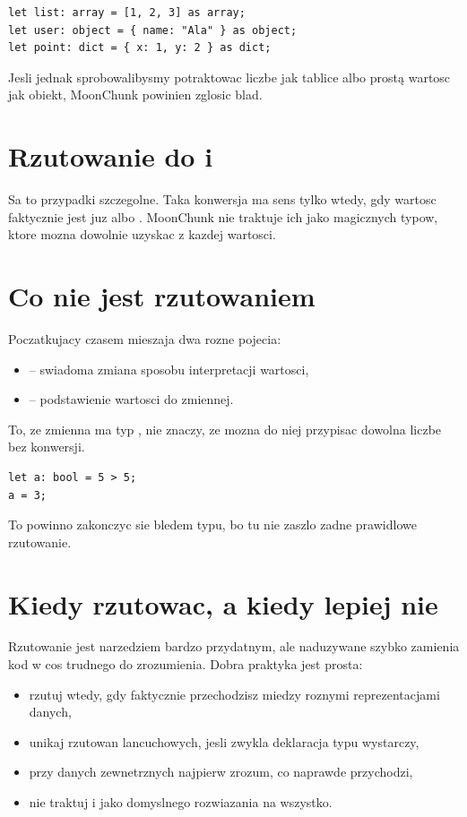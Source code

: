 \begin{lstlisting}[style=moonchunk,caption={Rzutowania typow zlozonych}]
let list: array = [1, 2, 3] as array;
let user: object = { name: "Ala" } as object;
let point: dict = { x: 1, y: 2 } as dict;
\end{lstlisting}

Jesli jednak sprobowalibysmy potraktowac liczbe jak tablice albo prostą wartosc jak
obiekt, MoonChunk powinien zglosic blad.

\section{Rzutowanie do  i }
Sa to przypadki szczegolne. Taka konwersja ma sens tylko wtedy, gdy wartosc faktycznie
jest juz  albo . MoonChunk nie traktuje ich jako magicznych typow,
ktore mozna dowolnie uzyskac z kazdej wartosci.

\section{Co nie jest rzutowaniem}
Poczatkujacy czasem mieszaja dwa rozne pojecia:

\begin{itemize}
  \item {} -- swiadoma zmiana sposobu interpretacji wartosci,
  \item {} -- podstawienie wartosci do zmiennej.
\end{itemize}

To, ze zmienna ma typ , nie znaczy, ze mozna do niej przypisac dowolna liczbe
bez konwersji.

\begin{lstlisting}[style=moonchunk,caption={Przypisanie bez zgodnosci typu}]
let a: bool = 5 > 5;
a = 3;
\end{lstlisting}

To powinno zakonczyc sie bledem typu, bo tu nie zaszlo zadne prawidlowe rzutowanie.

\section{Kiedy rzutowac, a kiedy lepiej nie}
Rzutowanie jest narzedziem bardzo przydatnym, ale naduzywane szybko zamienia kod w cos
trudnego do zrozumienia. Dobra praktyka jest prosta:

\begin{itemize}
  \item rzutuj wtedy, gdy faktycznie przechodzisz miedzy roznymi reprezentacjami danych,
  \item unikaj rzutowan lancuchowych, jesli zwykla deklaracja typu wystarczy,
  \item przy danych zewnetrznych najpierw zrozum, co naprawde przychodzi,
  \item nie traktuj  i  jako domyslnego rozwiazania na wszystko.
\end{itemize}

